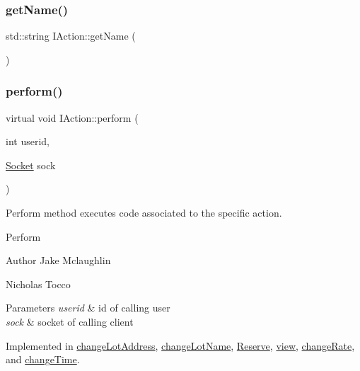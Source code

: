 \subsubsection{\texorpdfstring{get\+Name()}{getName()}}
{\footnotesize\ttfamily std\+::string I\+Action\+::get\+Name (\begin{DoxyParamCaption}{ }\end{DoxyParamCaption})\hspace{0.3cm}{\ttfamily [inline]}}

\mbox{\label{class_i_action_abaaa72a5af9c0169cb5b793292a5d18f}} 
\subsubsection{\texorpdfstring{perform()}{perform()}}
{\footnotesize\ttfamily virtual void I\+Action\+::perform (\begin{DoxyParamCaption}\item[{int}]{userid,  }\item[{\mbox{\hyperlink{class_socket}{Socket}}}]{sock }\end{DoxyParamCaption})\hspace{0.3cm}{\ttfamily [pure virtual]}}



Perform method executes code associated to the specific action. 

Perform   \begin{DoxyAuthor}{Author}
Jake Mclaughlin   

Nicholas Tocco 
\end{DoxyAuthor}

\begin{DoxyParams}{Parameters}
{\em userid} & id of calling user \\
\hline
{\em sock} & socket of calling client \\
\hline
\end{DoxyParams}


Implemented in \mbox{\hyperlink{classchange_lot_address_a506b13054e3f579bbc47b04e290a4ddf}{change\+Lot\+Address}}, \mbox{\hyperlink{classchange_lot_name_a0529a32316995ee8db0dd3e8c12f3efc}{change\+Lot\+Name}}, \mbox{\hyperlink{class_reserve_aa681b8b419edc579ba2892fc43fe3585}{Reserve}}, \mbox{\hyperlink{classview_afff29fcfad8be5de1bc6522722357ffa}{view}}, \mbox{\hyperlink{classchange_rate_a47fa95a4766f6828b6485c6ff3c4b620}{change\+Rate}}, and \mbox{\hyperlink{classchange_time_ab9a68e5091a5d09cebd638c812fa5923}{change\+Time}}.

